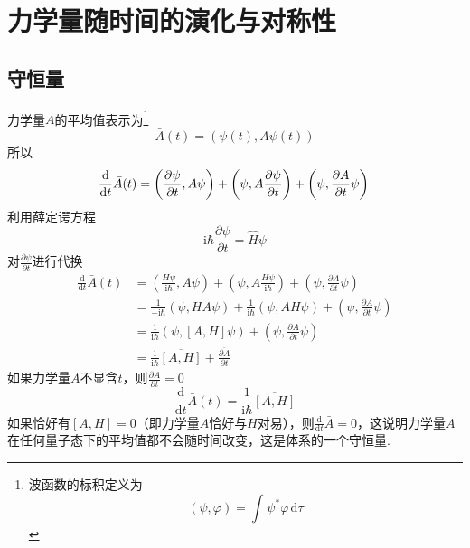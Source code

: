 \section{力学量随时间的演化与对称性}
\subsection{守恒量}
力学量$A$的平均值表示为\footnote{波函数的标积定义为$$\left(\psi, \varphi\right) = \int_{}^{}\psi^*\varphi \,\mathrm{d}\tau$$}
$$
    \bar{A}(t) = \left(\psi(t), A\psi(t)\right)
$$
所以
$$
    \frac{\mathrm{d}}{\mathrm{d}t}\bar{A}(t)
    =\left(\frac{\partial \psi}{\partial t}, A\psi\right) + \left(\psi, A\frac{\partial \psi}{\partial t}\right) + \left(\psi, \frac{\partial A}{\partial t}\psi\right) \\
$$
利用薛定谔方程
$$
    \mathrm{i}\hbar\frac{\partial \psi}{\partial t} = \hat{H}\psi
$$
对$\displaystyle \frac{\partial \psi}{\partial t}$进行代换
$$
    \begin{aligned}
        \frac{\mathrm{d}}{\mathrm{d}t}\bar{A}(t)
         & =\left(\frac{H\psi}{\mathrm{i}\hbar}, A\psi\right)+\left(\psi, A\frac{H\psi}{\mathrm{i}\hbar}\right) + \left(\psi, \frac{\partial A}{\partial t}\psi\right) \\
         & =\frac{1}{-\mathrm{i}\hbar}(\psi, HA\psi) + \frac{1}{\mathrm{i}\hbar}(\psi, AH\psi) + \left(\psi, \frac{\partial A}{\partial t}\psi\right)                  \\
         & =\frac{1}{\mathrm{i}\hbar}(\psi, [A,H]\psi) +  \left(\psi, \frac{\partial A}{\partial t}\psi\right)                                                         \\
         & =\frac{1}{\mathrm{i}\hbar}\overline{[A,H]}+\frac{\overline{\partial A}}{\partial t}
    \end{aligned}
$$
如果力学量$A$不显含$t$，则$\displaystyle \frac{\partial A}{\partial t}=0$
\begin{equation}
    \frac{\mathrm{d}}{\mathrm{d}t}\bar{A}(t)=\frac{1}{\mathrm{i}\hbar}\overline{[A,H]}
\end{equation}
如果恰好有$[A, H]=0$（即力学量$A$恰好与$H$对易），则$\displaystyle \frac{\mathrm{d}}{\mathrm{d}t}\bar{A}=0$，这说明力学量$A$在任何量子态下的平均值都不会随时间改变，这是体系的一个守恒量.

